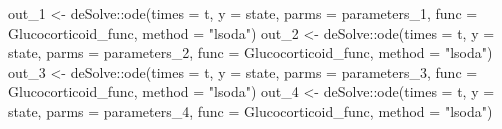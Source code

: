 \documentclass[
]{article}
\newenvironment{Shaded}{\begin{snugshade}}{\end{snugshade}}
\newcommand{\AttributeTok}[1]{\textcolor[rgb]{0.77,0.63,0.00}{#1}}
\newcommand{\FunctionTok}[1]{\textcolor[rgb]{0.00,0.00,0.00}{#1}}
\newcommand{\NormalTok}[1]{#1}
\newcommand{\OtherTok}[1]{\textcolor[rgb]{0.56,0.35,0.01}{#1}}
\newcommand{\SpecialCharTok}[1]{\textcolor[rgb]{0.00,0.00,0.00}{#1}}
\newcommand{\StringTok}[1]{\textcolor[rgb]{0.31,0.60,0.02}{#1}}
\begin{document}
\begin{Shaded}
\begin{Highlighting}[]
\NormalTok{out\_1 }\OtherTok{\textless{}{-}}\NormalTok{ deSolve}\SpecialCharTok{::}\FunctionTok{ode}\NormalTok{(}\AttributeTok{times =}\NormalTok{ t, }\AttributeTok{y =}\NormalTok{ state, }\AttributeTok{parms =}\NormalTok{ parameters\_1,}
                    \AttributeTok{func =}\NormalTok{ Glucocorticoid\_func, }\AttributeTok{method =} \StringTok{"lsoda"}\NormalTok{)}
\NormalTok{out\_2 }\OtherTok{\textless{}{-}}\NormalTok{ deSolve}\SpecialCharTok{::}\FunctionTok{ode}\NormalTok{(}\AttributeTok{times =}\NormalTok{ t, }\AttributeTok{y =}\NormalTok{ state, }\AttributeTok{parms =}\NormalTok{ parameters\_2,}
                    \AttributeTok{func =}\NormalTok{ Glucocorticoid\_func, }\AttributeTok{method =} \StringTok{"lsoda"}\NormalTok{)}
\NormalTok{out\_3 }\OtherTok{\textless{}{-}}\NormalTok{ deSolve}\SpecialCharTok{::}\FunctionTok{ode}\NormalTok{(}\AttributeTok{times =}\NormalTok{ t, }\AttributeTok{y =}\NormalTok{ state, }\AttributeTok{parms =}\NormalTok{ parameters\_3,}
                    \AttributeTok{func =}\NormalTok{ Glucocorticoid\_func, }\AttributeTok{method =} \StringTok{"lsoda"}\NormalTok{)}
\NormalTok{out\_4 }\OtherTok{\textless{}{-}}\NormalTok{ deSolve}\SpecialCharTok{::}\FunctionTok{ode}\NormalTok{(}\AttributeTok{times =}\NormalTok{ t, }\AttributeTok{y =}\NormalTok{ state, }\AttributeTok{parms =}\NormalTok{ parameters\_4,}
                    \AttributeTok{func =}\NormalTok{ Glucocorticoid\_func, }\AttributeTok{method =} \StringTok{"lsoda"}\NormalTok{)}


\end{Highlighting}
\end{Shaded}
\end{document}
